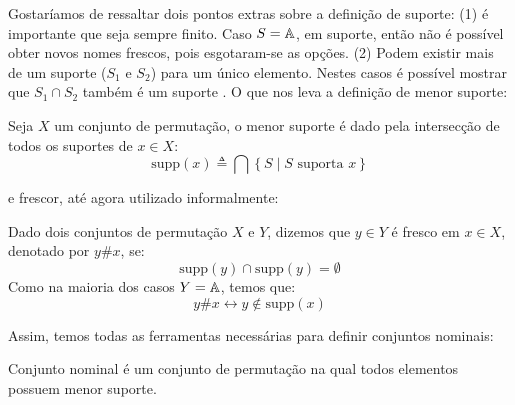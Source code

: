 Gostaríamos de ressaltar dois pontos extras sobre a definição de suporte: (1) é importante que seja sempre finito. Caso $S = \mathbb{A}$, em suporte, então não é possível obter novos nomes frescos, pois esgotaram-se as opções.
(2) Podem existir mais de um suporte ($S_1$ e $S_2$) para um único elemento. Nestes casos é possível mostrar que $S_1 \cap S_2$ também é um suporte \cite[Proposição 2.3]{Pitts2013}. O que nos leva a definição de menor suporte:
\begin{definicao}
	Seja $X$ um conjunto de permutação, o menor suporte é dado pela intersecção de todos os suportes de $x \in X$:
	\begin{equation}\label{eq:menor-suporte}
		\text{supp}(x) \triangleq \bigcap \left\{ S \mid S \text{ suporta } x \right\}
	\end{equation}	
\end{definicao}\noindent
e frescor, até agora utilizado informalmente:
\begin{definicao}[Frescor]
	Dado dois conjuntos de permutação $X$ e $Y$, dizemos que $y \in Y$ é fresco em $x \in X$, denotado por $y \# x$, se:
	\begin{equation}\label{eq:frescor-supp}
		\text{supp}(y) \cap \text{supp}(y) = \emptyset
	\end{equation}
	Como na maioria dos casos $Y = \mathbb{A}$, temos que:
	\begin{equation}\label{eq:frescor}
		y \# x \leftrightarrow y \notin \text{supp}(x)
	\end{equation}
\end{definicao}\noindent
Assim, temos todas as ferramentas necessárias para definir conjuntos nominais:
\begin{definicao}\label{def:conjunto-nominal}
	Conjunto nominal é um conjunto de permutação na qual todos elementos possuem menor suporte.
\end{definicao}

